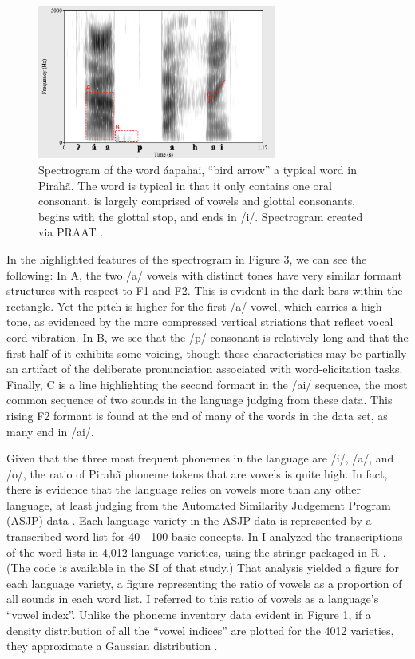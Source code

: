 \documentclass[output=paper,colorlinks,citecolor=brown
]{langscibook}
\begin{document}
\begin{figure}
\centering
\includegraphics[width=0.7\textwidth]{everett_figure3.png}
\caption{\label{fig:Figure 3}Spectrogram of the word {\textglotstop}áapahai, “bird arrow” a typical word in Pirahã. The word is typical in that it only contains one oral consonant, is largely comprised of vowels and glottal consonants, begins with the glottal stop, and ends in /i/. Spectrogram created via PRAAT \citep{boersma2018praat}.}

\end{figure}

    In the highlighted features of the spectrogram in Figure 3, we can see the following: In A, the two /a/ vowels with distinct tones have very similar formant structures with respect to F1 and F2. This is evident in the dark bars within the rectangle. Yet the pitch is higher for the first /a/ vowel, which carries a high tone, as evidenced by the more compressed vertical striations that reflect vocal cord vibration. In B, we see that the /p/ consonant is relatively long and that the first half of it exhibits some voicing, though these characteristics may be partially an artifact of the deliberate pronunciation associated with word-elicitation tasks. Finally, C is a line highlighting the second formant in the /ai/ sequence, the most common sequence of two sounds in the language judging from these data. This rising F2 formant is found at the end of many of the words in the data set, as many end in /ai/.

    Given that the three most frequent phonemes in the language are /i/, /a/, and /o/, the ratio of Pirahã phoneme tokens that are vowels is quite high. In fact, there is evidence that the language relies on vowels more than any other language, at least judging from the Automated Similarity Judgement Program (ASJP) data \citep{wichmann2016asjp}. Each language variety in the ASJP data is represented by a transcribed word list for 40—100 basic concepts. In  I analyzed the transcriptions of the word lists in 4,012 language varieties, using the stringr packaged in R \citep{wickham2019package}. (The code is available in the SI of that study.) That analysis yielded a figure for each language variety, a figure representing the ratio of vowels as a proportion of all sounds in each word list. I referred to this ratio of vowels as a language’s “vowel index”. Unlike the phoneme inventory data evident in Figure 1, if a density distribution of all the “vowel indices” are plotted for the 4012 varieties, they approximate a Gaussian distribution \citep{everett2017languages}. 
\end{document}
